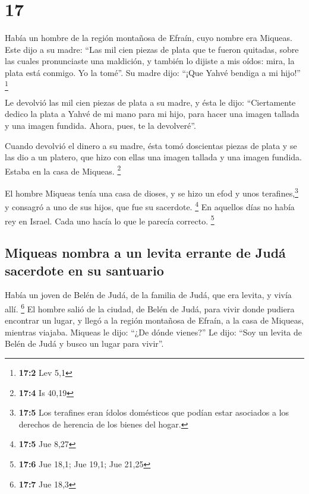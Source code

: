 \hypertarget{section-16}{%
\section{17}\label{section-16}}

 Había un hombre de la región montañosa de Efraín, cuyo
nombre era Miqueas.  Este dijo a su madre: ``Las mil cien
piezas de plata que te fueron quitadas, sobre las cuales pronunciaste
una maldición, y también lo dijiste a mis oídos: mira, la plata está
conmigo. Yo la tomé''. Su madre dijo: ``¡Que Yahvé bendiga a mi hijo!''
\footnote{\textbf{17:2} Lev 5,1}

 Le devolvió las mil cien piezas de plata a su madre, y
ésta le dijo: ``Ciertamente dedico la plata a Yahvé de mi mano para mi
hijo, para hacer una imagen tallada y una imagen fundida. Ahora, pues,
te la devolveré''.

 Cuando devolvió el dinero a su madre, ésta tomó
doscientas piezas de plata y se las dio a un platero, que hizo con ellas
una imagen tallada y una imagen fundida. Estaba en la casa de Miqueas.
\footnote{\textbf{17:4} Is 40,19}

 El hombre Miqueas tenía una casa de dioses, y se hizo un
efod y unos terafines,\footnote{\textbf{17:5} Los terafines eran ídolos
  domésticos que podían estar asociados a los derechos de herencia de
  los bienes del hogar.} y consagró a uno de sus hijos, que fue su
sacerdote. \footnote{\textbf{17:5} Jue 8,27}  En aquellos
días no había rey en Israel. Cada uno hacía lo que le parecía correcto.
\footnote{\textbf{17:6} Jue 18,1; Jue 19,1; Jue 21,25}

\hypertarget{miqueas-nombra-a-un-levita-errante-de-juduxe1-sacerdote-en-su-santuario}{%
\subsection{Miqueas nombra a un levita errante de Judá sacerdote en su
santuario}\label{miqueas-nombra-a-un-levita-errante-de-juduxe1-sacerdote-en-su-santuario}}

 Había un joven de Belén de Judá, de la familia de Judá,
que era levita, y vivía allí. \footnote{\textbf{17:7} Jue 18,3}
 El hombre salió de la ciudad, de Belén de Judá, para
vivir donde pudiera encontrar un lugar, y llegó a la región montañosa de
Efraín, a la casa de Miqueas, mientras viajaba.  Miqueas
le dijo: ``¿De dónde vienes?'' Le dijo: ``Soy un levita de Belén de Judá
y busco un lugar para vivir''.

